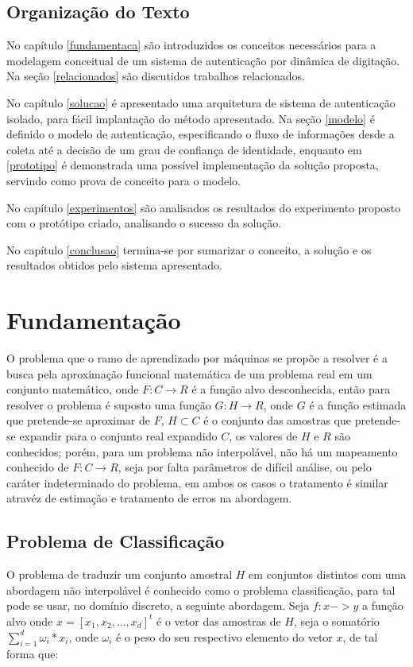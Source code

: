 \documentclass[pfc]{imetex}
\begin{document}
\section{Organização do Texto}
No capítulo \ref{fundamentaca} são introduzidos os conceitos necessários para a modelagem conceitual de um sistema de autenticação por dinâmica de digitação. Na seção \ref{relacionados} são discutidos trabalhos relacionados.

No capítulo \ref{solucao} é apresentado uma arquitetura de sistema de autenticação isolado, para fácil implantação do método apresentado. Na seção \ref{modelo} é definido o modelo de autenticação, especificando o fluxo de informações desde a coleta até a decisão de um grau de confiança de identidade, enquanto em \ref{prototipo} é demonstrada uma possível implementação da solução proposta, servindo como prova de conceito para o modelo.

No capítulo \ref{experimentos} são analisados os resultados do experimento proposto com o protótipo criado, analisando o sucesso da solução.

No capítulo \ref{conclusao} termina-se por sumarizar o conceito, a solução e os resultados obtidos pelo sistema apresentado.

\chapter{Fundamentação}
   O problema que o ramo de aprendizado por máquinas se propõe a resolver é a busca pela aproximação funcional matemática de um problema real em um conjunto matemático, onde $F:C \rightarrow R$ é a função alvo desconhecida, então para resolver o problema é suposto uma função $G:H \rightarrow R$, onde $G$ é a função estimada que pretende-se aproximar de $F$, $H \subset C$ é o conjunto das amostras que pretende-se expandir para o conjunto real expandido $C$, os valores de $H$ e $R$ são conhecidos; porém, para um problema não interpolável, não há um mapeamento conhecido de $F:C \rightarrow R$, seja por falta parâmetros de difícil análise, ou pelo caráter indeterminado do problema, em ambos os casos o tratamento é similar atravéz de estimação e tratamento de erros na abordagem.

\section{Problema de Classificação}

    O problema de traduzir um conjunto amostral $H$ em conjuntos distintos com uma abordagem não interpolável é conhecido como o problema classificação, para tal pode se usar, no domínio discreto, a seguinte abordagem. Seja $f: x->y$ a função alvo onde $x = [x_1,x_2,...,x_d]^t$ é o vetor das amostras de $H$, seja o somatório $\sum\limits_{i=1}^d \omega_i*x_i$, onde $\omega_i$ é o peso do seu respectivo elemento do vetor $x$, de tal forma que:
\end{document}
